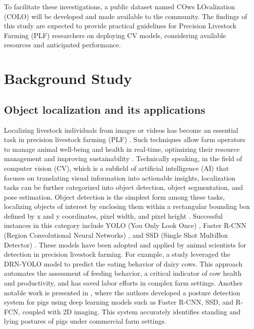 To facilitate these investigations, a public dataset named COws LOcalization (COLO) \cite{COLODataset2023} will be developed and made available to the community. The findings of this study are expected to provide practical guidelines for Precision Livestock Farming (PLF) researchers on deploying CV models, considering available resources and anticipated performance.

\section{Background Study}

\subsection*{Object localization and its applications}

Localizing livestock individuals from images or videos has become an essential task in precision livestock farming (PLF) \cite{fernandes2020image}. Such techniques allow farm operators to manage animal well-being and health in real-time, optimizing their resource management and improving sustainability \cite{morrone2022industry, hao2023cattle}. Technically speaking, in the field of computer vision (CV), which is a subfield of artificial intelligence (AI) that focuses on translating visual information into actionable insights, localization tasks can be further categorized into object detection, object segmentation, and pose estimation. Object detection is the simplest form among these tasks, localizing objects of interest by enclosing them within a rectangular bounding box defined by x and y coordinates, pixel width, and pixel height \cite{viola2001rapid}. Successful instances in this category include YOLO (You Only Look Once) \cite{redmon2016you}, Faster R-CNN (Region Convolutional Neural Networks) \cite{girshick2015fast}, and SSD (Single Shot MultiBox Detector) \cite{liu2016ssd}. These models have been adopted and applied by animal scientists for detection in precision livestock farming. For example, a study \cite{yu2022automatic} leveraged the DRN-YOLO model \cite{xu2020improved} to predict the eating behavior of dairy cows. This approach automates the assessment of feeding behavior, a critical indicator of cow health and productivity, and has saved labor efforts in complex farm settings. Another notable work is presented in \cite{nasirahmadi2019deep}, where the authors developed a posture detection system for pigs using deep learning models such as Faster R-CNN, SSD, and R-FCN, coupled with 2D imaging. This system accurately identifies standing and lying postures of pigs under commercial farm settings.

